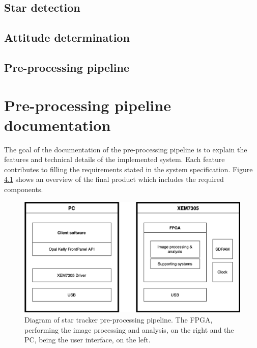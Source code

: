 \documentclass[12pt]{report}
\begin{document}
\section{Star detection}
\section{Attitude determination}
\section{Pre-processing pipeline}

\chapter{Pre-processing pipeline documentation}

The goal of the documentation of the pre-processing pipeline is to explain the features and technical details of the implemented system. Each feature contributes to filling the requirements stated in the system specification. Figure \ref{fig:overview} shows an overview of the final product which includes the required components.

\begin{figure}[h]
    \centering
    \includegraphics[scale=0.3]{figures/overview.png}
    \caption{Diagram of star tracker pre-processing pipeline. The FPGA, performing the image processing and analysis, on the right and the PC, being the user interface, on the left.}
    \label{fig:overview}
\end{figure}
\end{document}
